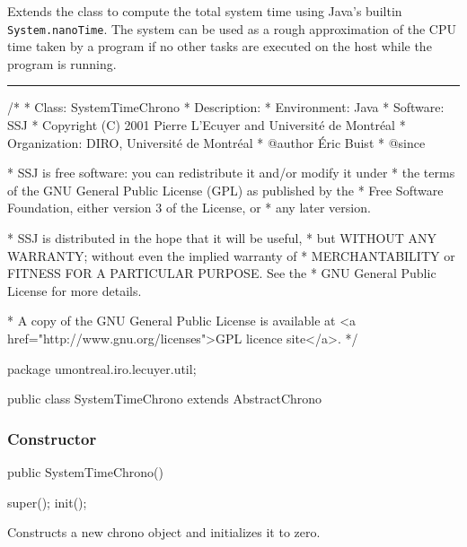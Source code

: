 
Extends the  class to compute
the total system time using Java's builtin \texttt{System.nanoTime}.
The system can be used as a rough approximation of the CPU time taken
by a program if no
other tasks are executed on the host while the program is running.

\bigskip\hrule

\begin{code}
\begin{hide}
/*
 * Class:        SystemTimeChrono
 * Description:  
 * Environment:  Java
 * Software:     SSJ 
 * Copyright (C) 2001  Pierre L'Ecuyer and Université de Montréal
 * Organization: DIRO, Université de Montréal
 * @author       Éric Buist
 * @since

 * SSJ is free software: you can redistribute it and/or modify it under
 * the terms of the GNU General Public License (GPL) as published by the
 * Free Software Foundation, either version 3 of the License, or
 * any later version.

 * SSJ is distributed in the hope that it will be useful,
 * but WITHOUT ANY WARRANTY; without even the implied warranty of
 * MERCHANTABILITY or FITNESS FOR A PARTICULAR PURPOSE.  See the
 * GNU General Public License for more details.

 * A copy of the GNU General Public License is available at
   <a href="http://www.gnu.org/licenses">GPL licence site</a>.
 */
\end{hide}
package umontreal.iro.lecuyer.util;


public class SystemTimeChrono extends AbstractChrono\begin{hide} {

   protected void getTime (long[] tab) {
      long rawTime = System.nanoTime();
      final long DIV = 1000000000L;
      long seconds = rawTime/DIV;
      long micros = (rawTime %
      tab[0] = seconds;
      tab[1] = micros;
   }\end{hide}
\end{code}

\subsubsection*{Constructor}

\begin{code}

   public SystemTimeChrono()\begin{hide} {
      super();
      init();
   }\end{hide}
\end{code}
  \begin{tabb} Constructs a new chrono object and
    initializes it to zero.
  \end{tabb}
\begin{code}
\begin{hide}
}\end{hide}
\end{code}
